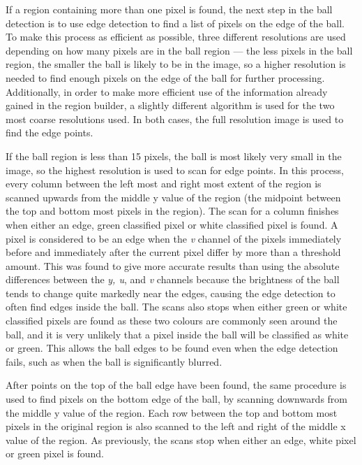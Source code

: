 \documentclass[pdftex,11pt,a4paper]{report}
\begin{document}
If a region containing more than one pixel is found, the next step in the ball detection is to use edge detection to find a list of pixels on the edge of the ball. To make this process as efficient as possible, three different resolutions are used depending on how many pixels are in the ball region --- the less pixels in the ball region, the smaller the ball is likely to be in the image, so a higher resolution is needed to find enough pixels on the edge of the ball for further processing. Additionally, in order to make more efficient use of the information already gained in the region builder, a slightly different algorithm is used for the two most coarse resolutions used. In both cases, the full resolution image is used to find the edge points.

If the ball region is less than 15 pixels, the ball is most likely very small in the image, so the highest resolution is used to scan for edge points. In this process, every column between the left most and right most extent of the region is scanned upwards from the middle y value of the region (the midpoint between the top and bottom most pixels in the region). The scan for a column finishes when either an edge, green classified pixel or white classified pixel is found. A pixel is considered to be an edge when the \emph{v} channel of the pixels immediately before and immediately after the current pixel differ by more than a threshold amount. This was found to give more accurate results than using the absolute differences between the \emph{y, u}, and \emph{v} channels because the brightness of the ball tends to change quite markedly near the edges, causing the edge detection to often find edges inside the ball. The scans also stops when either green or white classified pixels are found as these two colours are commonly seen around the ball, and it is very unlikely that a pixel inside the ball will be classified as white or green. This allows the ball edges to be found even when the edge detection fails, such as when the ball is significantly blurred.

After points on the top of the ball edge have been found, the same procedure is used to find pixels on the bottom edge of the ball, by scanning downwards from the middle y value of the region. Each row between the top and bottom most pixels in the original region is also scanned to the left and right of the middle x value of the region. As previously, the scans stop when either an edge, white pixel or green pixel is found.
\end{document}

